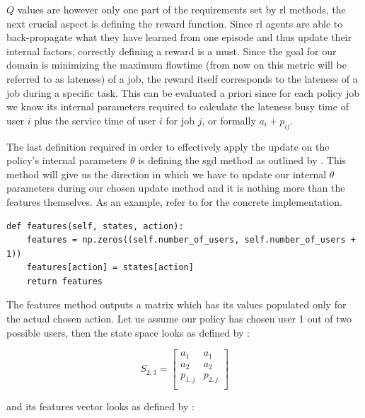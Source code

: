  $Q$ values are however only one part of the requirements set by \gls{rl} methods, the next crucial aspect is defining the reward function. Since \gls{rl} agents are able to back-propagate what they have learned from one episode and thus update their internal factors, correctly defining a reward is a must. Since the goal for our domain is minimizing the maximum flowtime (from now on this metric will be referred to as lateness) of a job, the reward itself corresponds to the lateness of a job during a specific task. This can be evaluated a priori since for each policy job we know its internal parameters required to calculate the lateness \ie busy time of user $i$ plus the service time of user $i$ for job $j$, or formally $a_i+p_{ij}$.

 The last definition required in order to effectively apply the update on the policy's internal parameters $\theta$ is defining the \gls{sgd} method as outlined by . This method will give us the direction in which we have to update our internal $\theta$ parameters during our chosen update method and it is nothing more than the features themselves. As an example, refer to  for the concrete implementation.

\begin{lstlisting}[caption=Features definition which initializes a null matrix and fills the column corresponding to the chosen action by the policy.,label=lst:features_definition,style=CustomPython]
def features(self, states, action):
    features = np.zeros((self.number_of_users, self.number_of_users + 1))
    features[action] = states[action]
    return features
\end{lstlisting}

The features method outputs a matrix which has its values populated only for the actual chosen action. Let us assume our policy has chosen user 1 out of two possible users, then the state space looks as defined by :

\begin{equation}
\label{eq:kbatch_sp_ex}
	S_{2,3} = 
	\begin{bmatrix}
	a_1 & a_1 \\
	a_2 & a_2 \\
	p_{1,j} & p_{2,j} \\
	\end{bmatrix}
\end{equation}

and its features vector looks as defined by :

